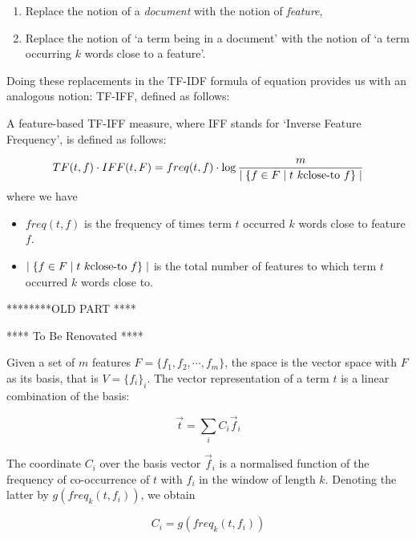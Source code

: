 \begin{enumerate}
\item   Replace the notion of a  \emph{document}  with the notion of  \emph{feature}, 
\item  Replace the notion of `a term being in a document'  with the notion of `a term occurring $k$ words close to a feature'.  
\end{enumerate}

Doing these replacements in the TF-IDF formula of equation  \label {tf-idf} provides us with an analogous notion:   TF-IFF, defined as follows:

\begin{definition}
A feature-based TF-IFF  measure, where IFF stands for `Inverse Feature Frequency', is defined as follows:

\begin{equation}
\label{tf-iff}
TF(t,f) \cdot IFF(t, F) = freq(t, f) \cdot \log{{m} \over {\mid \{f \in F \mid t  \ k\textmd{close-to} \ f \} \mid}}
\end{equation}
where we have
\begin{itemize}
\item $freq(t, f)$ is the frequency of times term $t$ occurred $k$ words close to feature $f$.
\item $\mid \{f \in F \mid t  \ k\textmd{close-to} \ f \} \mid$ is the total number of features to which term $t$ occurred $k$ words close to. 
\end{itemize}

\end{definition}


********OLD PART ****

**** To Be Renovated ****

Given a set of $m$ features $F = \{f_1, f_2, \cdots, f_m\}$, the space is the vector space with $F$ as its basis, that is $V = \{f_i\}_i$. The vector representation of a term $t$ is a linear combination of the basis:

\begin{equation}
\label{vector-word}
\overrightarrow{t}  = \sum_i  C_i  \overrightarrow{f}_i
\end{equation}

The coordinate $C_i$ over the basis vector $\overrightarrow{f}_i$ is a normalised function of the frequency of co-occurrence of $t$ with $f_i$ in the window of length $k$. Denoting the latter by  $g(freq_k(t,f_i))$, we obtain 

\begin{equation}
C_i = g(freq_k(t,f_i))
\end{equation}

